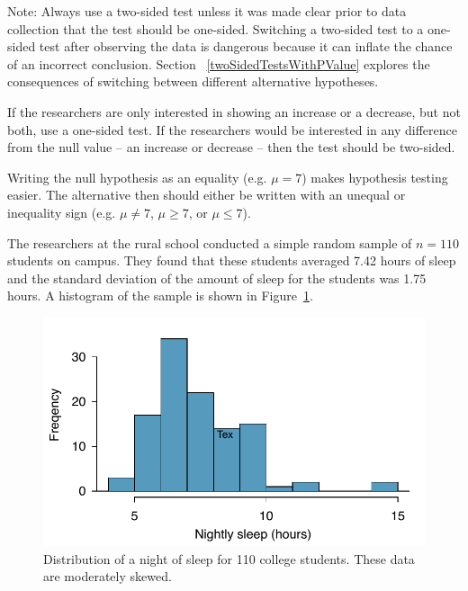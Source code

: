 Note: Always use a two-sided test unless it was made clear prior to data collection that the test should be one-sided. Switching a two-sided test to a one-sided test after observing the data is dangerous because it can inflate the chance of an incorrect conclusion. Section ~\ref{twoSidedTestsWithPValue} explores the consequences of switching between different alternative hypotheses. 

\begin{tipBox}{
If the researchers are only interested in showing an increase or a decrease, but not both, use a one-sided test. If the researchers would be interested in any difference from the null value -- an increase or decrease -- then the test should be two-sided.\vspace{0.5mm}}
\end{tipBox}

\begin{tipBox}{
Writing the null hypothesis as an equality (e.g. $\mu = 7$) makes hypothesis testing easier. The alternative then should either be written with an unequal or inequality sign (e.g. $\mu\neq7$, $\mu \geq7$, or $\mu \leq7$).}
\end{tipBox}

The researchers at the rural school conducted a simple random sample of $n=110$ students on campus. They found that these students averaged 7.42 hours of sleep and the standard deviation of the amount of sleep for the students was 1.75 hours. A histogram of the sample is shown in Figure~\ref{histOfSleepForCollegeThatWasCheckingForMoreThan7Hours}.

\begin{figure}
\centering
\includegraphics[width = \textwidth]{ch_inference_foundations_oi_biostat/figures/histOfSleepForCollegeThatWasCheckingForMoreThan7Hours/histOfSleepForCollegeThatWasCheckingForMoreThan7Hours}
\caption{Distribution of a night of sleep for 110 college students. These data are moderately skewed.}
\label{histOfSleepForCollegeThatWasCheckingForMoreThan7Hours}
\end{figure}

